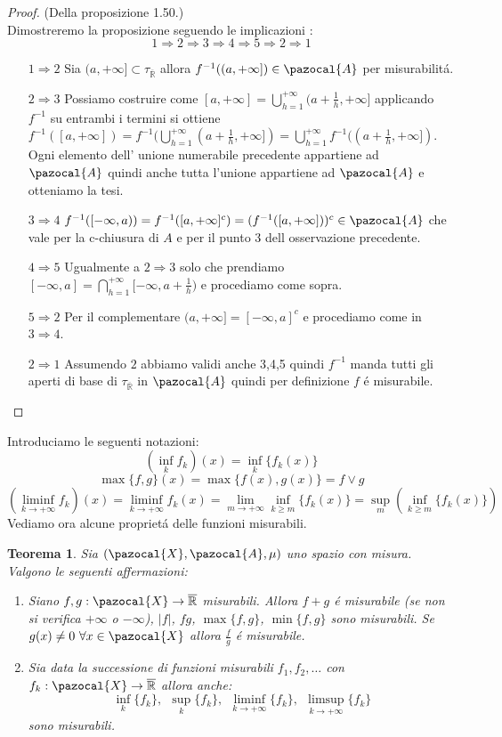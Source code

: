 \documentclass[11pt,a4paper]{report}
\theoremstyle{plain}
\newtheorem{thm}{Teorema}[chapter] %
\theoremstyle{definition}
\newcommand{\X}{\pazocal{X}}
\newcommand{\A}{\pazocal{A}}
\begin{document}
\begin{proof}
	(Della proposizione 1.50.)\\
	Dimostreremo la proposizione seguendo le implicazioni :
	\[
		 1 \Rightarrow 2 \Rightarrow 3 \Rightarrow 4 \Rightarrow 5 \Rightarrow 2 \Rightarrow 1
	\]
	\begin{itemize}
		\item[$1 \Rightarrow 2$] Sia $(a,+\infty] \subset \tau_{\mathbb{\overline{R}}}$ allora $f^{-1}((a,+\infty]) \in \A$ per misurabilit\'a.
		\item[$2 \Rightarrow 3$] Possiamo costruire come $[a,+\infty] = \bigcup\limits_{h=1}^{+\infty}(a + \frac{1}{h},+\infty]$ applicando $f^{-1}$ su entrambi i termini si ottiene $f^{-1}([a,+\infty]) = f^{-1}(\bigcup\limits_{h=1}^{+\infty}(a + \frac{1}{h},+\infty]) = \bigcup\limits_{h=1}^{+\infty}f^{-1}((a + \frac{1}{h},+\infty])$. Ogni elemento dell' unione numerabile precedente appartiene ad $\A$ quindi anche tutta l'unione appartiene ad $\A$ e otteniamo la tesi.
		\item[$3 \Rightarrow 4$] $f^{-1}([-\infty,a)) = f^{-1}([a,+\infty]^c) = (f^{-1}([a,+\infty]))^c \in \A$ che vale per la c-chiusura di $A$ e per il punto 3 dell osservazione precedente.
		\item[$4 \Rightarrow 5$] Ugualmente a $2 \Rightarrow 3$ solo che prendiamo $[-\infty,a] = \bigcap\limits_{h=1}^{+\infty}[-\infty,a+\frac{1}{h})$ e procediamo come sopra.
		\item[$5 \Rightarrow 2$] Per il complementare $(a,+\infty] = [-\infty,a]^c$ e procediamo come in $3 \Rightarrow 4$.
		\item[$2 \Rightarrow 1$] Assumendo $2$ abbiamo validi anche 3,4,5 quindi $f^{-1}$ manda tutti gli aperti di base di $\tau_{\mathbb{\overline{R}}}$ in $\A$ quindi per definizione $f$ \'e  misurabile.
	\end{itemize}
\end{proof}
Introduciamo le seguenti notazioni:
\[
	(\inf\limits_k f_k)(x) = \inf\limits_k\{f_k(x)\}
\]
\[
	\max\{f,g\}(x) = \max\{f(x),g(x)\} = f \vee g
\]
\[
	(\liminf\limits_{k \rightarrow +\infty}f_k)(x) = \liminf\limits_{k \rightarrow +\infty}f_k(x) = \lim\limits_{m \rightarrow +\infty}\inf\limits_{k\ge m}\{f_k(x)\} = \sup\limits_m(\inf\limits_{k \ge m}\{f_k(x)\})
\]
Vediamo ora alcune propriet\'a delle funzioni misurabili.
\begin{thm}
	Sia $(\X,\A,\mu)$ uno spazio con misura. Valgono le seguenti affermazioni:
	\begin{enumerate}
		\item Siano $f,g:\X \rightarrow \overline{\mathbb{R}}$ misurabili. Allora $f+g$ \'e  misurabile (se non si verifica $+\infty$ o $-\infty$), $|f|$, $fg$, $\max\{f,g\}$, $\min\{f,g\}$ sono misurabili.
		Se $g(x) \ne 0\ \forall x \in \X$ allora $\frac{f}{g}$ \'e misurabile.
		
		\item Sia data la successione di funzioni misurabili $f_1,f_2,\ldots$ con $f_k : \X \rightarrow \overline{\mathbb{R}}$ allora anche:
		\[
			\inf\limits_k\{f_k\},\ \ \sup\limits_k\{f_k\},\ \ \liminf\limits_{k \rightarrow +\infty}\{f_k\},\ \ \limsup\limits_{k \rightarrow +\infty}\{f_k\}
		\]
		sono misurabili.
	\end{enumerate}
\end{thm}
\end{document}
